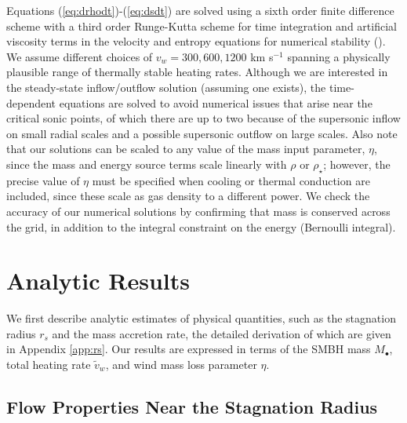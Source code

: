 \documentclass[usenatbib,fleqn]{mn2e}
\newcommand{\rs}{r_s}
\begin{document}
Equations (\ref{eq:drhodt})-(\ref{eq:dsdt}) are solved using a sixth
order finite difference scheme with a third order Runge-Kutta scheme
for time integration and artificial viscosity terms in the velocity
and entropy equations for numerical stability
(\citealt{Brandenburg:2003a}).  We assume different choices of $v_{w}
= 300, 600, 1200$ km s$^{-1}$ spanning a physically plausible range of
thermally stable heating rates.  Although we are
interested in the steady-state inflow/outflow solution (assuming one
exists), the time-dependent equations are solved to avoid numerical
issues that arise near the critical sonic points, of which there are
up to two because of the supersonic inflow on small radial scales and
a possible supersonic outflow on large scales.  Also note that our
solutions can be scaled to any value of the mass input parameter,
$\eta$, since the mass and energy source terms scale linearly with
$\rho$ or $\rho_{\star}$; however, the precise value of $\eta$ must be
specified when cooling or thermal conduction are included, since these
scale as gas density to a different power.  We check the accuracy of
our numerical solutions by confirming that mass is conserved across
the grid, in addition to the integral constraint on the energy
(Bernoulli integral).



\section{Analytic Results}
\label{sec:results}

We first describe analytic estimates of physical quantities, such as
the stagnation radius $\rs$ and the mass accretion rate, the detailed
derivation of which are given in Appendix \ref{app:rs}.  Our results
are expressed in terms of the SMBH mass $M_{\bullet}$, total heating
rate $\tilde{v}_{w}$, and wind mass loss parameter $\eta$.

\subsection{Flow Properties Near the Stagnation Radius}
\end{document}
